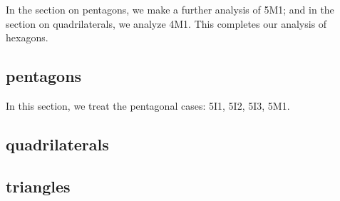 In the section on pentagons, we make a further analysis of 5M1; and in the section on quadrilaterals, we analyze 4M1.
This completes our analysis of hexagons.  

\subsection{pentagons}

In this section, we treat the pentagonal cases: 5I1, 5I2, 5I3, 5M1.


\subsection{quadrilaterals}
\subsection{triangles}









